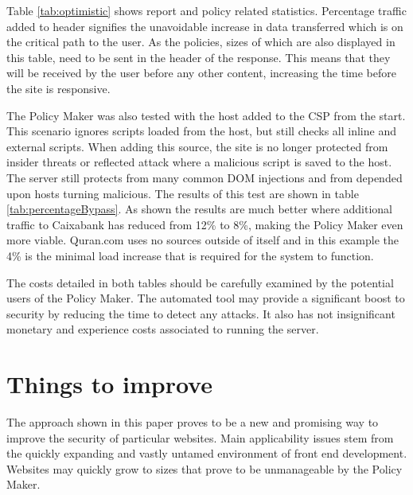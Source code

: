 \newpage
Table \ref{tab:optimistic} shows report and policy related statistics.
Percentage traffic added to header signifies the unavoidable increase in data transferred which is on the critical path to the user.
As the policies, sizes of which are also displayed in this table, need to be sent in the header of the response.
This means that they will be received by the user before any other content, increasing the time before the site is responsive.


The Policy Maker was also tested with the host added to the CSP from the start.
This scenario ignores scripts loaded from the host, but still checks all inline and external scripts.
When adding this source, the site is no longer protected from insider threats or reflected attack where a malicious script is saved to the host.
The server still protects from many common DOM injections and from depended upon hosts turning malicious.
The results of this test are shown in table \ref{tab:percentageBypass}.
As shown the results are much better where additional traffic to Caixabank has reduced from 12\% to 8\%, making the Policy Maker even more viable.
Quran.com uses no sources outside of itself and in this example the 4\% is the minimal load increase that is required for the system to function.


The costs detailed in both tables should be carefully examined by the potential users of the Policy Maker.
The automated tool may provide a significant boost to security by reducing the time to detect any attacks.
It also has not insignificant monetary and experience costs associated to running the server.


\section{Things to improve}

The approach shown in this paper proves to be a new and promising way to improve the security of particular websites.
Main applicability issues stem from the quickly expanding and vastly untamed environment of front end development.
Websites may quickly grow to sizes that prove to be unmanageable by the Policy Maker.

